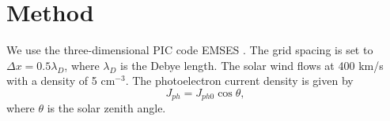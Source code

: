 \section{Method}
We use the three-dimensional PIC code EMSES \cite{Miyake2009}.
The grid spacing is set to $\Delta x = 0.5\lambda_D$, where $\lambda_D$ is the Debye length.
The solar wind flows at 400 km/s with a density of 5 cm$^{-3}$.
The photoelectron current density is given by
\begin{equation}
J_{ph} = J_{ph0} \cos\theta ,
\label{eq:jph}
\end{equation}
where $\theta$ is the solar zenith angle.

